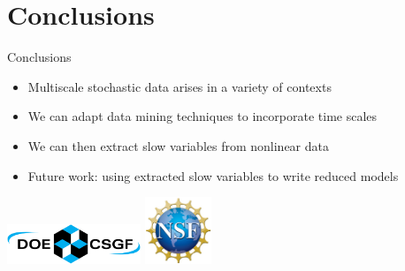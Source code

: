 \documentclass[12pt]{beamer}
\begin{document}
\section{Conclusions}

\begin{frame}{Conclusions}

\begin{itemize}
\item Multiscale stochastic data arises in a variety of contexts
\item We can adapt data mining techniques to incorporate time scales
\item We can then extract slow variables from nonlinear data
\item Future work: using extracted slow variables to write reduced models

\end{itemize}

\vspace{2cm}
\centering
\includegraphics[width=4cm]{csgf_logo}
\hspace{2cm}
\includegraphics[width=2cm]{nsf_logo}

\end{frame}
\end{document}
